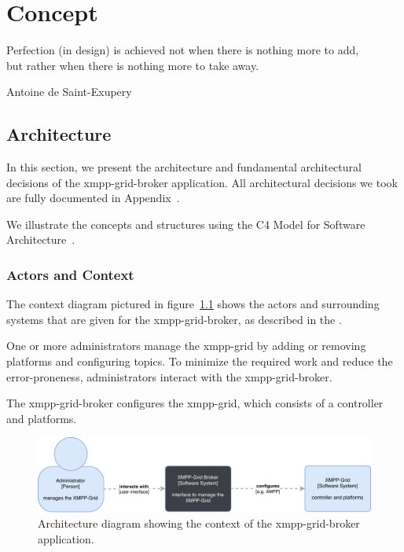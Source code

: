 \chapter{Concept} %
\epigraph{Perfection (in design) is achieved not when there is nothing more to add,\\but rather when there is nothing more to take away.}{Antoine de Saint-Exupery}

\section{Architecture}\label{sec:architecture}

In this section, we present the architecture and fundamental architectural decisions of the \gls{xmpp-grid-broker} application.
All architectural decisions we took are fully documented in Appendix~.

We illustrate the concepts and structures using the C4 Model for Software Architecture~\cite{c4-model}.

\subsection{Actors and Context}

The context diagram pictured in figure~\ref{fig:architecturecontext} shows the actors and surrounding systems that are given for the \gls{xmpp-grid-broker}, as described in the .

One or more administrators manage the \gls{xmpp-grid} by adding or removing \glspl{platform} and configuring \glspl{topic}.
To minimize the required work and reduce the error-proneness, administrators interact with the \gls{xmpp-grid-broker}.

The \gls{xmpp-grid-broker} configures the \gls{xmpp-grid}, which consists of a \gls{controller} and \glspl{platform}.

\begin{figure}[h]
\centering
\includegraphics[width=\linewidth]{resources/architecture_context}
\caption[Architecture context diagram]{Architecture diagram showing the context of the \gls{xmpp-grid-broker} application.}
\label{fig:architecturecontext}
\end{figure}


